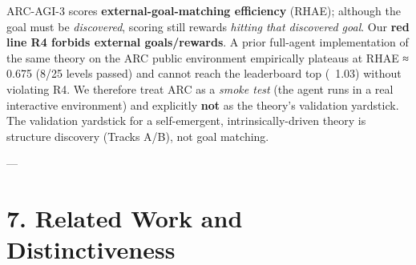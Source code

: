 \documentclass[11pt]{article}
\begin{document}
ARC-AGI-3 scores \textbf{external-goal-matching efficiency} (RHAE); although the goal must be \emph{discovered}, scoring still rewards \emph{hitting that discovered goal}. Our \textbf{red line R4 forbids external goals/rewards}. A prior full-agent implementation of the same theory on the ARC public environment empirically plateaus at RHAE ≈ 0.675 (8/25 levels passed) and cannot reach the leaderboard top (~1.03) without violating R4. We therefore treat ARC as a \emph{smoke test} (the agent runs in a real interactive environment) and explicitly \textbf{not} as the theory's validation yardstick. The validation yardstick for a self-emergent, intrinsically-driven theory is structure discovery (Tracks A/B), not goal matching.

---

\section{7. Related Work and Distinctiveness}
\end{document}
